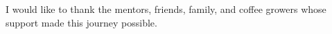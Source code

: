 I would like to thank the mentors, friends, family, and coffee growers whose support made this journey possible.